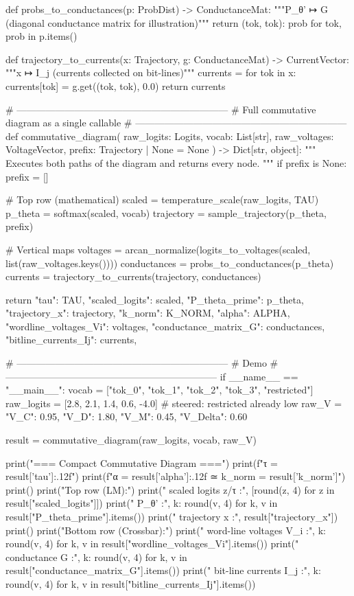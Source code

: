 def probs_to_conductances(p: ProbDist) -> ConductanceMat:
    """P_θ'  ↦  G  (diagonal conductance matrix for illustration)"""
    return {(tok, tok): prob for tok, prob in p.items()}

def trajectory_to_currents(x: Trajectory, g: ConductanceMat) -> CurrentVector:
    """x  ↦  I_j  (currents collected on bit-lines)"""
    currents = {}
    for tok in x:
        currents[tok] = g.get((tok, tok), 0.0)
    return currents

# ------------------------------------------------------------------
# Full commutative diagram as a single callable
# ------------------------------------------------------------------
def commutative_diagram(
    raw_logits: Logits,
    vocab: List[str],
    raw_voltages: VoltageVector,
    prefix: Trajectory | None = None
) -> Dict[str, object]:
    """
    Executes both paths of the diagram and returns every node.
    """
    if prefix is None:
        prefix = []

    # Top row (mathematical)
    scaled = temperature_scale(raw_logits, TAU)
    p_theta = softmax(scaled, vocab)
    trajectory = sample_trajectory(p_theta, prefix)

    # Vertical maps
    voltages = arcan_normalize(logits_to_voltages(scaled, list(raw_voltages.keys())))
    conductances = probs_to_conductances(p_theta)
    currents = trajectory_to_currents(trajectory, conductances)

    return {
        "tau": TAU,
        "scaled_logits": scaled,
        "P_theta_prime": p_theta,
        "trajectory_x": trajectory,
        "k_norm": K_NORM,
        "alpha": ALPHA,
        "wordline_voltages_Vi": voltages,
        "conductance_matrix_G": conductances,
        "bitline_currents_Ij": currents,
    }

# ------------------------------------------------------------------
# Demo
# ------------------------------------------------------------------
if __name__ == "__main__":
    vocab = ["tok_0", "tok_1", "tok_2", "tok_3", "restricted"]
    raw_logits = [2.8, 2.1, 1.4, 0.6, -4.0]          # steered: restricted already low
    raw_V = {"V_C": 0.95, "V_D": 1.80, "V_M": 0.45, "V_Delta": 0.60}

    result = commutative_diagram(raw_logits, vocab, raw_V)

    print("=== Compact Commutative Diagram ===\n")
    print(f"τ = {result['tau']:.12f}")
    print(f"α = {result['alpha']:.12f}   ≃   k_norm = {result['k_norm']}")
    print()
    print("Top row (LM):")
    print("  scaled logits z/τ :", [round(z, 4) for z in result["scaled_logits"]])
    print("  P_θ'              :", {k: round(v, 4) for k, v in result["P_theta_prime"].items()})
    print("  trajectory x      :", result["trajectory_x"])
    print()
    print("Bottom row (Crossbar):")
    print("  word-line voltages V_i :", {k: round(v, 4) for k, v in result["wordline_voltages_Vi"].items()})
    print("  conductance G          :", {k: round(v, 4) for k, v in result["conductance_matrix_G"].items()})
    print("  bit-line currents I_j  :", {k: round(v, 4) for k, v in result["bitline_currents_Ij"].items()})
